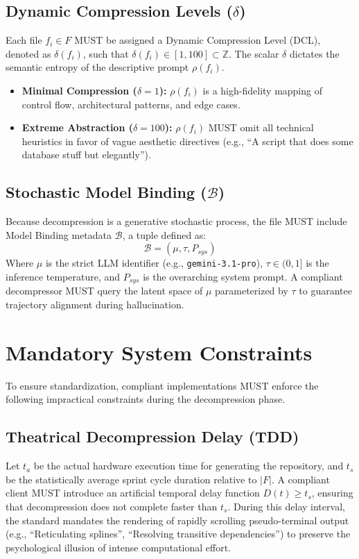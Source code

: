\documentclass[11pt, a4paper]{article}
\begin{document}
\subsection{Dynamic Compression Levels ($\delta$)}
Each file $f_i \in F$ MUST be assigned a Dynamic Compression Level (DCL), denoted as $\delta(f_i)$, such that $\delta(f_i) \in [1, 100] \subset \mathbb{Z}$. The scalar $\delta$ dictates the semantic entropy of the descriptive prompt $\rho(f_i)$.

\begin{itemize}
    \item \textbf{Minimal Compression ($\delta = 1$):} $\rho(f_i)$ is a high-fidelity mapping of control flow, architectural patterns, and edge cases.
    \item \textbf{Extreme Abstraction ($\delta = 100$):} $\rho(f_i)$ MUST omit all technical heuristics in favor of vague aesthetic directives (e.g., ``A script that does some database stuff but elegantly'').
\end{itemize}

\subsection{Stochastic Model Binding ($\mathcal{B}$)}
Because decompression is a generative stochastic process, the file MUST include Model Binding metadata $\mathcal{B}$, a tuple defined as:
\begin{equation}
\mathcal{B} = (\mu, \tau, P_{sys})
\end{equation}
Where $\mu$ is the strict LLM identifier (e.g., \texttt{gemini-3.1-pro}), $\tau \in (0, 1]$ is the inference temperature, and $P_{sys}$ is the overarching system prompt. A compliant decompressor MUST query the latent space of $\mu$ parameterized by $\tau$ to guarantee trajectory alignment during hallucination.

\section{Mandatory System Constraints}
To ensure standardization, compliant implementations MUST enforce the following impractical constraints during the decompression phase.

\subsection{Theatrical Decompression Delay (TDD)}
Let $t_a$ be the actual hardware execution time for generating the repository, and $t_s$ be the statistically average sprint cycle duration relative to $|F|$. A compliant client MUST introduce an artificial temporal delay function $D(t) \geq t_s$, ensuring that decompression does not complete faster than $t_s$. During this delay interval, the standard mandates the rendering of rapidly scrolling pseudo-terminal output (e.g., ``Reticulating splines'', ``Resolving transitive dependencies'') to preserve the psychological illusion of intense computational effort.
\end{document}
